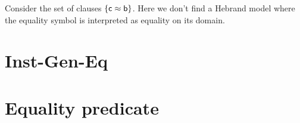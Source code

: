 \begin{example}
	Consider the set of clauses $\{ {\mathsf c} \approx {\mathsf b} \}$. Here we don't find a Hebrand model where the equality symbol is interpreted as equality on its domain.
\end{example}


	
	



\section{Inst-Gen-Eq}

\section{Equality predicate}

